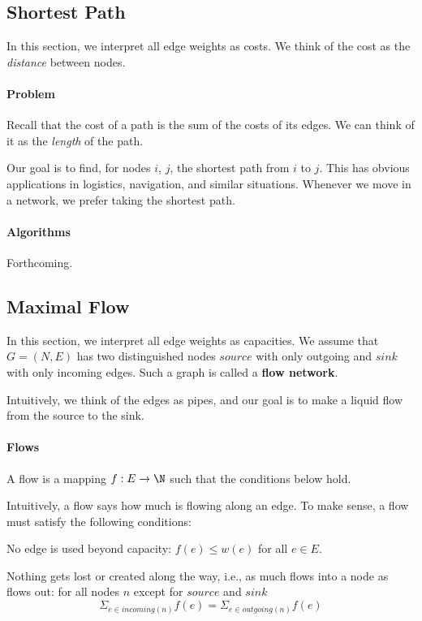 \subsection{Shortest Path}\label{sec:ad:shortestpath}

In this section, we interpret all edge weights as costs.
We think of the cost as the \emph{distance} between nodes.

\paragraph{Problem}
Recall that the cost of a path is the sum of the costs of its edges.
We can think of it as the \emph{length} of the path.

Our goal is to find, for nodes $i$, $j$, the shortest path from $i$ to $j$.
This has obvious applications in logistics, navigation, and similar situations.
Whenever we move in a network, we prefer taking the shortest path.

\paragraph{Algorithms}
Forthcoming.

\subsection{Maximal Flow}\label{sec:ad:maximalflow}

In this section, we interpret all edge weights as capacities.
We assume that $G=(N,E)$ has two distinguished nodes $source$ with only outgoing and $sink$ with only incoming edges.
Such a graph is called a \textbf{flow network}.

Intuitively, we think of the edges as pipes, and our goal is to make a liquid flow from the source to the sink.

\paragraph{Flows}
A flow is a mapping $f:E\to \N$ such that the conditions below hold.

Intuitively, a flow says how much is flowing along an edge.
To make sense, a flow must satisfy the following conditions:
\begin{compactitem}
 \item No edge is used beyond capacity: $f(e)\leq w(e)$ for all $e\in E$.
 \item Nothing gets lost or created along the way, i.e., as much flows into a node as flows out: for all nodes $n$ except for $source$ and $sink$
  \[\Sigma_{e\in incoming(n)} f(e) = \Sigma_{e\in outgoing(n)} f(e)\]
\end{compactitem}

